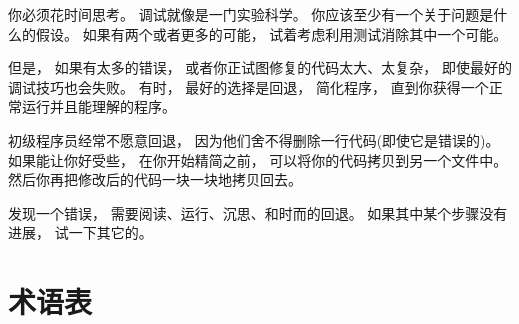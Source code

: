 {


你必须花时间思考。  调试就像是一门实验科学。
你应该至少有一个关于问题是什么的假设。
如果有两个或者更多的可能， 试着考虑利用测试消除其中一个可能。


但是， 如果有太多的错误， 或者你正试图修复的代码太大、太复杂，
即使最好的调试技巧也会失败。
有时， 最好的选择是回退， 简化程序， 直到你获得一个正常运行并且能理解的程序。


初级程序员经常不愿意回退， 因为他们舍不得删除一行代码(即使它是错误的)。
如果能让你好受些， 在你开始精简之前， 可以将你的代码拷贝到另一个文件中。
然后你再把修改后的代码一块一块地拷贝回去。


发现一个错误， 需要阅读、运行、沉思、和时而的回退。
如果其中某个步骤没有进展， 试一下其它的。

\section{术语表}
\begin{description}


\end{description}}
